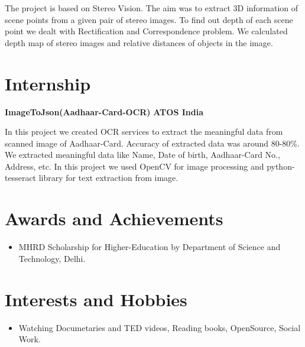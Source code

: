 \documentclass{article}
\begin{document}
\vspace*{.031mm}
\hspace*{2.6mm} The project is based on Stereo Vision. The aim was to extract 3D information of scene points from a given pair of stereo images. To find out depth of each scene point we dealt with Rectification and Correspondence problem. We calculated depth map of stereo images and relative distances of objects in the image.

\vspace*{.4cm}
\section{Internship}
\textbf{\large{ImageToJson(Aadhaar-Card-OCR)}} \hspace*{9cm} \textbf{ATOS India}

\vspace*{.051mm}
\hspace*{2.6mm} In this project we created OCR services to extract the meaningful data from scanned image of Aadhaar-Card. Accuracy of extracted data was around 80-80$\%.$ We extracted meaningful data like Name, Date of birth, Aadhaar-Card No., Address, etc. In this project we used OpenCV for image processing and python-tesseract library for text extraction from image.

\vspace*{.3cm}
\section{Awards and Achievements}
\begin{itemize}
\item MHRD Scholarship for Higher-Education by Department of Science and Technology, Delhi.
\end{itemize}

\vspace*{.1cm}
\section{Interests and Hobbies}
\begin{itemize}
\item Watching Documetaries and TED videos, Reading books, OpenSource, Social Work.
\end{itemize}
%
\end{document}
